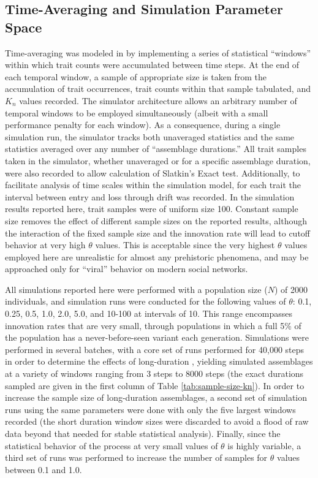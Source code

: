 \subsection{Time-Averaging and Simulation Parameter Space}
\label{sec-ta-method}
Time-averaging was modeled in \tf by implementing a series of statistical ``windows'' within which trait counts were accumulated between time steps.  At the end of each temporal window, a sample of appropriate size is taken from the accumulation of trait occurrences, trait counts within that sample tabulated, and $K_n$ values recorded.  The simulator architecture allows an arbitrary number of temporal windows to be employed simultaneously (albeit with a small performance penalty for each window).  As a consequence, during a single simulation run, the simulator tracks both unaveraged statistics and the same statistics averaged over any number of ``assemblage durations.''  All trait samples taken in the simulator, whether unaveraged or for a specific assemblage duration, were also recorded to allow calculation of Slatkin's Exact test. Additionally, to facilitate analysis of time scales within the simulation model, for each trait the interval between entry and loss through drift was recorded.   In the simulation results reported here, trait samples were of uniform size 100.  Constant sample size removes the effect of different sample sizes on the reported results, although the interaction of the fixed sample size and the innovation rate will lead to cutoff behavior at very high $\theta$ values.  This is acceptable since the very highest $\theta$ values employed here are unrealistic for almost any prehistoric phenomena, and may be approached only for ``viral'' behavior on modern social networks.    

All simulations reported here were performed with a population size ($N$) of 2000 individuals, and simulation runs were conducted for the following values of $\theta$:  0.1, 0.25, 0.5, 1.0, 2.0, 5.0, and 10-100 at intervals of 10.  This range encompasses innovation rates that are very small, through populations in which a full 5\% of the population has a never\hyp{}before\hyp{}seen variant each generation.  Simulations were performed in several batches, with a core set of runs performed for 40,000 steps in order to determine the effects of long-duration \timeav, yielding simulated assemblages at a variety of windows ranging from 3 steps to 8000 steps (the exact durations sampled are given in the first column of Table \ref{tab:sample-size-kn}).  In order to increase the sample size of long-duration assemblages, a second set of simulation runs using the same parameters were done with only the five largest windows recorded (the short duration window sizes were discarded to avoid a flood of raw data beyond that needed for stable statistical analysis).  Finally, since the statistical behavior of the process at very small values of $\theta$ is highly variable, a third set of runs was performed to increase the number of samples for $\theta$ values between 0.1 and 1.0.  

